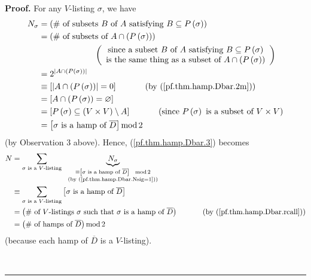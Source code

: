 \documentclass[numbers=enddot,12pt,final,onecolumn,notitlepage]{scrartcl}%
\numberwithin{exer}{subsection}
\theoremstyle{definition}
\newenvironment{proof}[1][Proof]{\noindent\textbf{#1.} }{\ \rule{0.5em}{0.5em}}
\let\sumnonlimits\sum
\renewcommand{\sum}{\sumnonlimits\limits}
\begin{document}
\begin{proof}
For any $V$-listing $\sigma$, we have%
\begin{align}
N_{\sigma}  &  =\left(  \#\text{ of subsets }B\text{ of }A\text{ satisfying
}B\subseteq P\left(  \sigma\right)  \right) \nonumber\\
&  =\left(  \#\text{ of subsets of }A\cap\left(  P\left(  \sigma\right)
\right)  \right) \nonumber\\
&  \ \ \ \ \ \ \ \ \ \ \ \ \ \ \ \ \ \ \ \ \left(
\begin{array}
[c]{c}%
\text{since a subset }B\text{ of }A\text{ satisfying }B\subseteq P\left(
\sigma\right) \\
\text{is the same thing as a subset of }A\cap\left(  P\left(  \sigma\right)
\right)
\end{array}
\right) \nonumber\\
&  =2^{\left\vert A\cap\left(  P\left(  \sigma\right)  \right)  \right\vert
}\nonumber\\
&  \equiv\left[  \left\vert A\cap\left(  P\left(  \sigma\right)  \right)
\right\vert =0\right]  \ \ \ \ \ \ \ \ \ \ \left(  \text{by
(\ref{pf.thm.hamp.Dbar.2m})}\right) \nonumber\\
&  =\left[  A\cap\left(  P\left(  \sigma\right)  \right)  =\varnothing\right]
\nonumber\\
&  =\left[  P\left(  \sigma\right)  \subseteq\left(  V\times V\right)
\setminus A\right]  \ \ \ \ \ \ \ \ \ \ \left(  \text{since }P\left(
\sigma\right)  \text{ is a subset of }V\times V\right) \nonumber\\
&  =\left[  \sigma\text{ is a hamp of }\overline{D}\right]  \operatorname{mod}%
2 \label{pf.thm.hamp.Dbar.Nsig=1}%
\end{align}
(by Observation 3 above). Hence, (\ref{pf.thm.hamp.Dbar.3}) becomes%
\begin{align}
N  &  =\sum_{\sigma\text{ is a }V\text{-listing}}\ \ \underbrace{N_{\sigma}%
}_{\substack{\equiv\left[  \sigma\text{ is a hamp of }\overline{D}\right]
\ \ \operatorname{mod}2\\\text{(by (\ref{pf.thm.hamp.Dbar.Nsig=1}))}%
}}\nonumber\\
&  \equiv\sum_{\sigma\text{ is a }V\text{-listing}}\left[  \sigma\text{ is a
hamp of }\overline{D}\right] \nonumber\\
&  =\left(  \#\text{ of }V\text{-listings }\sigma\text{ such that }%
\sigma\text{ is a hamp of }\overline{D}\right)  \ \ \ \ \ \ \ \ \ \ \left(
\text{by (\ref{pf.thm.hamp.Dbar.rcall})}\right) \nonumber\\
&  =\left(  \#\text{ of hamps of }\overline{D}\right)  \operatorname{mod}2
\label{pf.thm.hamp.Dbar.5}%
\end{align}
(because each hamp of $\overline{D}$ is a $V$-listing).


\end{proof}
\end{document}
